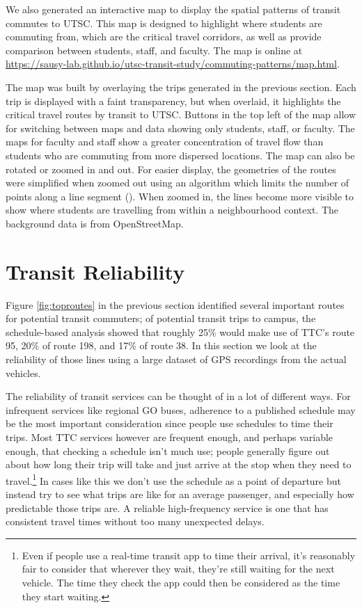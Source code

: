 \documentclass{article}
\begin{document}
		We also generated an interactive map to display the spatial patterns of transit commutes to UTSC. This map is designed to highlight where students are commuting from, which are the critical travel corridors, as well as provide comparison between students, staff, and faculty. The map is online at \url{https://sausy-lab.github.io/utsc-transit-study/commuting-patterns/map.html}.
	
		The map was built by overlaying the trips generated in the previous section. Each trip is displayed with a faint transparency, but when overlaid, it highlights the critical travel routes by transit to UTSC. Buttons in the top left of the map allow for switching between maps and data showing only students, staff, or faculty. The maps for faculty and staff show a greater concentration of travel flow than students who are commuting from more dispersed locations. The map can also be rotated or zoomed in and out. For easier display, the geometries of the routes were simplified when zoomed out using an algorithm which limits the number of points along a line segment (\cite{douglas1973}). When zoomed in, the lines become more visible to show where students are travelling from within a neighbourhood context. The background data is from OpenStreetMap.



\section{Transit Reliability}\label{sec:reliability}
	Figure \ref{fig:toproutes} in the previous section identified several important routes for potential transit commuters; of potential transit trips to campus, the schedule-based analysis showed that roughly 25\% would make use of TTC's route 95, 20\% of route 198, and 17\% of route 38.
	In this section we look at the reliability of those lines using a large dataset of GPS recordings from the actual vehicles. 

	The reliability of transit services can be thought of in a lot of different ways. For infrequent services like regional GO buses, adherence to a published schedule may be the most important consideration since people use schedules to time their trips. Most TTC services however are frequent enough, and perhaps variable enough, that checking a schedule isn't much use; people generally figure out about how long their trip will take and just arrive at the stop when they need to travel.\footnote{
		Even if people use a real-time transit app to time their arrival, it's reasonably fair to consider that wherever they wait, they're still waiting for the next vehicle. The time they check the app could then be considered as the time they start waiting.
	} 
	In cases like this we don't use the schedule as a point of departure but instead try to see what trips are like for an average passenger, and especially how predictable those trips are. A reliable high-frequency service is one that has consistent travel times without too many unexpected delays. 
\end{document}
